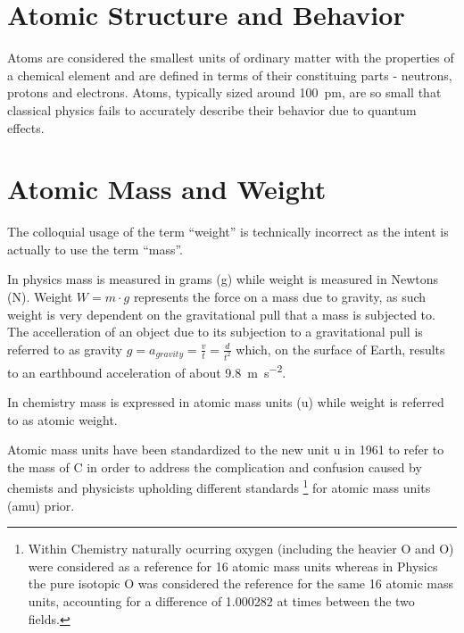 \section{Atomic Structure and Behavior}
Atoms are considered the smallest units of ordinary matter with the
properties of a chemical element and are defined in terms of their constituing
parts - neutrons, protons and electrons. Atoms, typically sized around
\SI{100}{\pico\meter}, are so small that classical physics fails to accurately
describe their behavior due to quantum effects.

\section{Atomic Mass and Weight}
The colloquial usage of the term ``weight'' is technically incorrect as the
intent is actually to use the term ``mass''.

In physics mass is measured in grams (\si{\gram}) while weight is measured in
Newtons (\si{\newton}).
Weight $W = m\cdot g$ represents the force on a mass due to
gravity, as such weight is very dependent on the gravitational pull that a
mass is subjected to.
The accelleration of an object due to its subjection to a gravitational pull is
referred to as gravity $g = a_{gravity} = \frac{v}{t} = \frac{d}{t^2}$
which, on the surface of Earth, results to an earthbound acceleration of about
\SI{9.8}{\meter\second^{-2}}.

In chemistry mass is expressed in atomic mass units (\si{\atomicmassunit})
while weight is referred to as atomic weight.

Atomic mass units have been standardized to the new
unit \si{\atomicmassunit} in 1961 to refer to the mass of C in order
to address the complication and confusion caused by chemists and physicists
upholding different standards
\footnote{Within Chemistry naturally ocurring oxygen (including the heavier
O and O) were considered as a reference for 16 atomic mass
units whereas in Physics the pure isotopic O was considered the
reference for the same 16 atomic mass units, accounting for a difference of
\num{1.000282} at times between the two fields.} for atomic mass units (amu)
prior.
